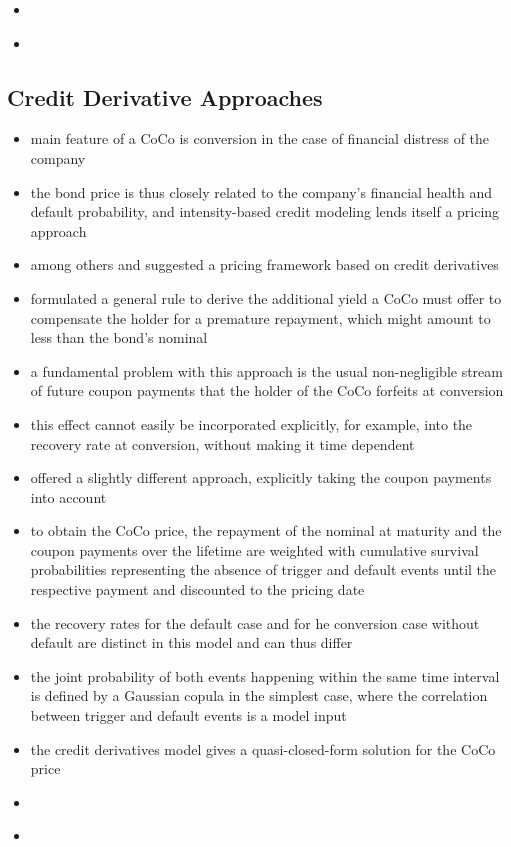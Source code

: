 \begin{itemize}
\item \citet{alvemar2012modelling}
\item \citet{erismann2015pricing}
\end{itemize}

\subsection*{Credit Derivative Approaches}

\begin{itemize}
\item main feature of a CoCo is conversion in the case of financial distress of the company
\item the bond price is thus closely related to the company's financial health and default probability, and intensity-based credit modeling lends itself a pricing approach
\item among others \citet{de2011pricing} and \citet{serjantov2011hybrid} suggested a pricing framework based on credit derivatives
\item \citet{de2011pricing} formulated a general rule to derive the additional yield a CoCo must offer to compensate the holder for a premature repayment, which might amount to less than the bond's nominal 
\item a fundamental problem with this approach is the usual non-negligible stream of future coupon payments that the holder of the CoCo forfeits at conversion
\item this effect cannot easily be incorporated explicitly, for example, into the recovery rate at conversion, without making it time dependent
\item \citet{serjantov2011hybrid} offered a slightly different approach, explicitly taking the coupon payments into account
\item to obtain the CoCo price, the repayment of the nominal at maturity and the coupon payments over the lifetime are weighted with cumulative survival probabilities representing the absence of trigger and default events until the respective payment and discounted to the pricing date
\item the recovery rates for the default case and for he conversion case without default are distinct in this model and can thus differ
\item the joint probability of both events happening within the same time interval is defined by a Gaussian copula in the simplest case, where the correlation between trigger and default events is a model input
\item the credit derivatives model gives a quasi-closed-form solution for the CoCo price
\item \citet{alvemar2012modelling}
\item \citet{erismann2015pricing}
\end{itemize}

